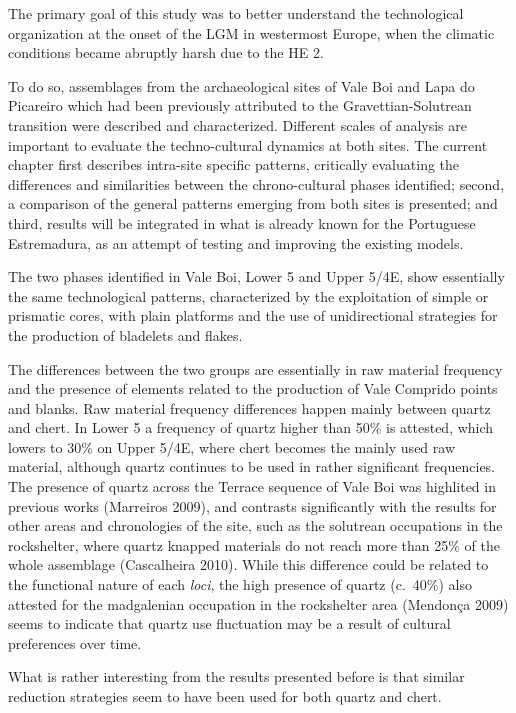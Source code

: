 \documentclass[12pt,twoside]{reedthesis}
\begin{document}
The primary goal of this study was to better understand the technological organization at the onset of the LGM in westermost Europe, when the climatic conditions became abruptly harsh due to the HE 2.

To do so, assemblages from the archaeological sites of Vale Boi and Lapa do Picareiro which had been previously attributed to the Gravettian-Solutrean transition were described and characterized. Different scales of analysis are important to evaluate the techno-cultural dynamics at both sites. The current chapter first describes intra-site specific patterns, critically evaluating the differences and similarities between the chrono-cultural phases identified; second, a comparison of the general patterns emerging from both sites is presented; and third, results will be integrated in what is already known for the Portuguese Estremadura, as an attempt of testing and improving the existing models.

The two phases identified in Vale Boi, Lower 5 and Upper 5/4E, show essentially the same technological patterns, characterized by the exploitation of simple or prismatic cores, with plain platforms and the use of unidirectional strategies for the production of bladelets and flakes.

The differences between the two groups are essentially in raw material frequency and the presence of elements related to the production of Vale Comprido points and blanks. Raw material frequency differences happen mainly between quartz and chert. In Lower 5 a frequency of quartz higher than 50\% is attested, which lowers to 30\% on Upper 5/4E, where chert becomes the mainly used raw material, although quartz continues to be used in rather significant frequencies. The presence of quartz across the Terrace sequence of Vale Boi was highlited in previous works (Marreiros 2009), and contrasts significantly with the results for other areas and chronologies of the site, such as the solutrean occupations in the rockshelter, where quartz knapped materials do not reach more than 25\% of the whole assemblage (Cascalheira 2010). While this difference could be related to the functional nature of each \emph{loci}, the high presence of quartz (c.~40\%) also attested for the madgalenian occupation in the rockshelter area (Mendonça 2009) seems to indicate that quartz use fluctuation may be a result of cultural preferences over time.

What is rather interesting from the results presented before is that similar reduction strategies seem to have been used for both quartz and chert.
\end{document}
